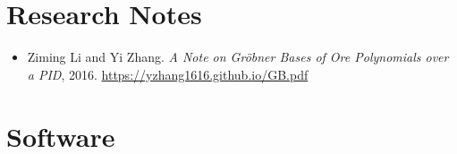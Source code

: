 \documentclass[a4paper,12pt]{article}
\begin{document}
\section*{\Large{Research Notes}}
\begin{itemize}
 \item Ziming Li and Yi Zhang. {\em A Note on Gr\"{o}bner Bases of Ore Polynomials over a PID}, 2016. 
 \url{https://yzhang1616.github.io/GB.pdf} 
\end{itemize}

\section*{\Large{Software}}
\end{document}
